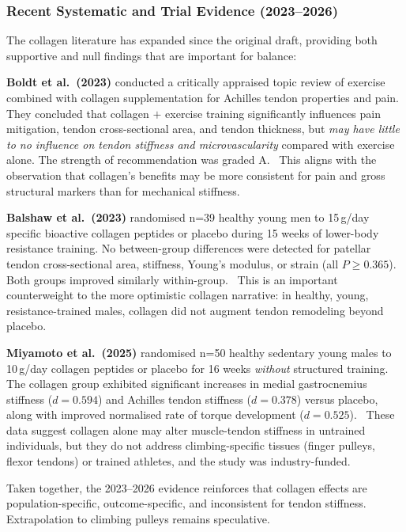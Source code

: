 \subsubsection{Recent Systematic and Trial Evidence (2023--2026)}

The collagen literature has expanded since the original draft, providing both supportive and null findings that are important for balance:

\textbf{Boldt et al.\ (2023)} conducted a critically appraised topic review of exercise combined with collagen supplementation for Achilles tendon properties and pain. They concluded that collagen $+$ exercise training significantly influences pain mitigation, tendon cross-sectional area, and tendon thickness, but \textit{may have little to no influence on tendon stiffness and microvascularity} compared with exercise alone. The strength of recommendation was graded A.\ \cite{Boldt23} This aligns with the observation that collagen's benefits may be more consistent for pain and gross structural markers than for mechanical stiffness.

\textbf{Balshaw et al.\ (2023)} randomised n=39 healthy young men to 15\,g/day specific bioactive collagen peptides or placebo during 15 weeks of lower-body resistance training. No between-group differences were detected for patellar tendon cross-sectional area, stiffness, Young's modulus, or strain (all $P \geq 0.365$). Both groups improved similarly within-group.\ \cite{Balshaw23} This is an important counterweight to the more optimistic collagen narrative: in healthy, young, resistance-trained males, collagen did not augment tendon remodeling beyond placebo.

\textbf{Miyamoto et al.\ (2025)} randomised n=50 healthy sedentary young males to 10\,g/day collagen peptides or placebo for 16 weeks \textit{without} structured training. The collagen group exhibited significant increases in medial gastrocnemius stiffness ($d{=}0.594$) and Achilles tendon stiffness ($d{=}0.378$) versus placebo, along with improved normalised rate of torque development ($d{=}0.525$).\ \cite{Miyamoto25} These data suggest collagen alone may alter muscle-tendon stiffness in untrained individuals, but they do not address climbing-specific tissues (finger pulleys, flexor tendons) or trained athletes, and the study was industry-funded.

Taken together, the 2023--2026 evidence reinforces that collagen effects are population-specific, outcome-specific, and inconsistent for tendon stiffness. Extrapolation to climbing pulleys remains speculative.


